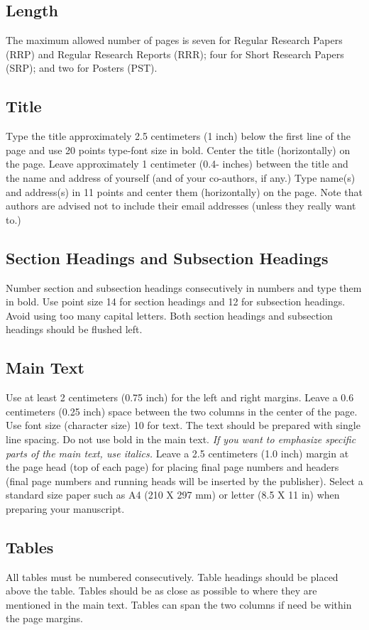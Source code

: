 \documentclass[conference]{csce}
\begin{document}
\subsection{Length}
The maximum allowed number of pages is seven for Regular Research Papers (RRP) 
and Regular Research Reports (RRR); four for Short Research Papers (SRP); and two for Posters (PST).

\subsection{Title}
Type the title approximately 2.5 centimeters (1 inch) below the first line of the 
page and use 20 points type-font size in bold. Center the title (horizontally) on the page. 
Leave approximately 1 centimeter (0.4- inches) between the title and the name and 
address of yourself (and of your co-authors, if any.) Type name(s) and address(s) in 11 points 
and center them (horizontally) on the page. Note that authors are advised not to include 
their email addresses (unless they really want to.)

\subsection{Section Headings and Subsection Headings}
Number section and subsection headings consecutively in numbers and type 
them in bold. Use point size 14 for section headings and 12 for subsection headings. 
Avoid using too many capital letters. Both section headings and 
subsection headings should be flushed left.

\subsection{Main Text}
Use at least 2 centimeters (0.75 inch) for the left and right margins. 
Leave a 0.6 centimeters (0.25 inch) space between the two columns in the 
center of the page. Use font size (character size) 10 for text. The text 
should be prepared with single line spacing. Do not use bold in the main text. 
{\em If you want to emphasize specific parts of the main text, use italics.} Leave a 
2.5 centimeters (1.0 inch) margin at the page head (top of each page) for placing 
final page numbers and headers (final page numbers and running heads will be inserted 
by the publisher). Select a standard size paper such as A4 (210 X 297 mm) or letter 
(8.5 X 11 in) when preparing your manuscript.


\subsection{Tables}\label{sec:table}
All tables must be numbered consecutively. Table headings should be placed 
above the table. Tables should be as close as possible to where they 
are mentioned in the main text. Tables can span the two columns if 
need be within the page margins.
\end{document}
